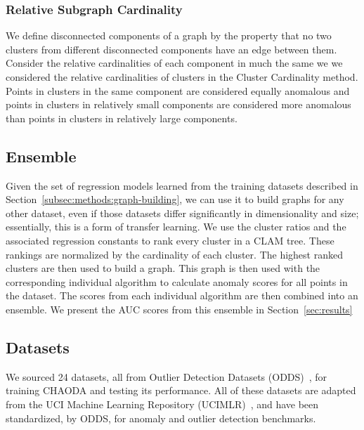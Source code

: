 \subsubsection{Relative Subgraph Cardinality}
We define disconnected components of a graph by the property that no two clusters from different disconnected components have an edge between them.
Consider the relative cardinalities of each component in much the same we we considered the relative cardinalities of clusters in the Cluster Cardinality method.
Points in clusters in the same component are considered equally anomalous and points in clusters in relatively small components are considered more anomalous than points in clusters in relatively large components.





\subsection{Ensemble}\label{subsec:methods:ensemble}
Given the set of regression models learned from the training datasets described in Section~\ref{subsec:methods:graph-building}, we can use it to build graphs for any other dataset, even if those datasets differ significantly in dimensionality and size; essentially, this is a form of transfer learning.
We use the cluster ratios and the associated regression constants to rank every cluster in a CLAM tree.
These rankings are normalized by the cardinality of each cluster.
The highest ranked clusters are then used to build a graph.
This graph is then used with the corresponding individual algorithm to calculate anomaly scores for all points in the dataset.{}
The scores from each individual algorithm are then combined into an ensemble.
We present the AUC scores from this ensemble in Section~\ref{sec:results}


\subsection{Datasets}\label{subsec:methods:datasets}

We sourced 24 datasets, all from Outlier Detection Datasets (ODDS)~\cite{rayana2016odds}, for training CHAODA and testing its performance.
All of these datasets are adapted from the UCI Machine Learning Repository (UCIMLR)~\cite{UCIMLR}, and have been standardized, by ODDS, for anomaly and outlier detection benchmarks.

